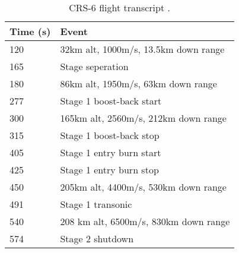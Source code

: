 \begin{table}[!htb]
\centering
\begin{tabular}{|l|l|}
\hline
\rowcolor[HTML]{C0C0C0} 
Time (s) & Event                                 \\ \hline
120      & 32km alt, 1000m/s, 13.5km down range  \\ \hline
\rowcolor[HTML]{EFEFEF} 
165      & Stage seperation                      \\ \hline
180      & 86km alt, 1950m/s, 63km down range    \\ \hline
\rowcolor[HTML]{EFEFEF} 
277      & Stage 1 boost-back start              \\ \hline
300      & 165km alt, 2560m/s, 212km down range  \\ \hline
\rowcolor[HTML]{EFEFEF} 
315      & Stage 1 boost-back stop               \\ \hline
405      & Stage 1 entry burn start              \\ \hline
\rowcolor[HTML]{EFEFEF} 
425      & Stage 1 entry burn stop               \\ \hline
450      & 205km alt, 4400m/s, 530km down range  \\ \hline
\rowcolor[HTML]{EFEFEF} 
491      & Stage 1 transonic                     \\ \hline
540      & 208 km alt, 6500m/s, 830km down range \\ \hline
\rowcolor[HTML]{EFEFEF} 
574      & Stage 2 shutdown \\ \hline
\end{tabular}
\caption{CRS-6 flight transcript \cite{CRS6}.}
\label{tab:CRS6}
\end{table}
